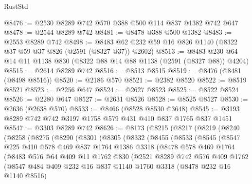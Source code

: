 \begin{lexlean}{RustStd}
\begin{coremodule}
@8476 := @2530 @8289 @742 @570 @388 @500 @114 @837 @1382 @742 @647
@8478 := @2544 @8289 @742
@8481 := @8478 @388 @500 @1382
@8483 := @2553 @8289 @742
@8498 := @8483 @62 @232 @59 @16 @826 @1140 (@8322 @37 @59 @37 @826 (@2591 (@8327 @37)) @2602)
@8513 := @8483 @230 @64 @14 @11 @1138 @830 (@8322 @88 @14 @88 @1138 (@2591 (@8327 @88)) @4204)
@8515 := @2614 @8289 @742
@8516 := @8513 @8515
@8519 := @8476 (@8481 (@8498 @8516))
@8520 := @2186 @570
@8521 := @2382 @8520
@8522 := @8519 @8521
@8523 := @2256 @647
@8524 := @2627 @8523
@8525 := @8522 @8524
@8526 := @2280 @647
@8527 := @2631 @8526
@8528 := @8525 @8527
@8530 := @2636 (@2638 @570)
@8533 := @8466 (@8528 @8530 @3648)
@8545 := @3193 @8289 @742 @742 @3197 @1758 @579 @431 @410 @837 @1765 @837 @1451
@8547 := @3303 @8289 @742
@8626 := @8173
    (@8215
      (@8217
        (@8219
          (@8240
            (@8258
              (@8275
                (@8290
                  (@8301
                    (@8305
                      (@8332
                        (@8455
                          (@8533
                            (@8545
                              (@8547
                                @225
                                @410
                                @578
                                @469
                                @837
                                @1764
                                @1386
                                @3318
                                (@8478
                                  @578
                                  @469
                                  @1764
                                  (@8483
                                    @576
                                    @64
                                    @409
                                    @11
                                    @1762
                                    @830
                                    (@2521
                                      @8289
                                      @742
                                      @576
                                      @409
                                      @1762
                                      (@8547
                                        @484
                                        @409
                                        @232
                                        @16
                                        @837
                                        @1140
                                        @1760
                                        @3318
                                        (@8478 @232 @16 @1140 @8516)

\end{coremodule}
\end{lexlean}
